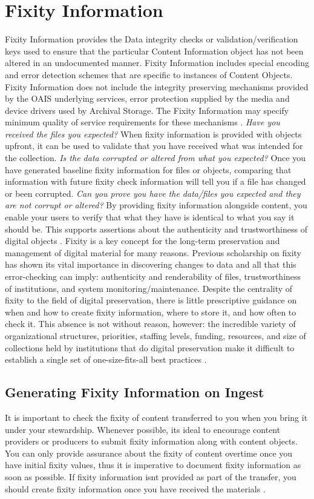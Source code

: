 \section{Fixity Information}
Fixity Information provides the Data integrity checks or validation/verification keys used to ensure that the particular Content Information object has not been altered in an undocumented manner. Fixity Information includes special encoding and error detection schemes that are specific to instances of Content Objects. Fixity Information does not include the integrity preserving mechanisms provided by the OAIS underlying services, error protection supplied by the media and device drivers used by Archival Storage. The Fixity Information may specify minimum quality of service requirements for these mechanisms \cite[4-30]{ccsds2012oais}.
\textit{Have you received the files you expected?} When fixity information is provided with objects upfront, it can be used to validate that you have received what was intended for the collection.
\textit{Is the data corrupted or altered from what you expected?}  Once you have generated baseline fixity information for files or objects, comparing that information with future fixity check information will tell you if a file has changed or been corrupted.
\textit{Can you prove you have the data/files you expected and they are not corrupt or altered?} By providing fixity information alongside content, you enable your users to verify that what they have is identical to what you say it should be. This supports assertions about the authenticity and trustworthiness of digital objects \cite[3]{ndsa2017fixity}.
Fixity is a key concept for the long-term preservation and management of digital material for many reasons. Previous scholarship on fixity has shown its vital importance in discovering changes to data and all that this error-checking can imply: authenticity and renderability of files, trustworthiness of institutions, and system monitoring/maintenance. Despite the centrality of fixity to the field of digital preservation, there is little prescriptive guidance on when and how to create fixity information, where to store it, and how often to check it. This absence is not without reason, however: the incredible variety of organizational structures, priorities, staffing levels, funding, resources, and size of collections held by institutions that do digital preservation make it difficult to establish a single set of one-size-fits-all best practices \cite[38]{ndsa2017fixity}.
\subsection{Generating Fixity Information on Ingest}
 It is important to check the fixity
of content transferred to you when you bring it under your stewardship. Whenever possible, its ideal to encourage content providers or producers to submit fixity information along with content objects. You can only provide assurance about the fixity of content overtime once you have initial fixity values, thus it is imperative to document fixity information as soon as possible. If fixity information isnt provided as part of the transfer, you should create fixity information once you have received the materials \cite[4]{ndsa2014fixity}.
